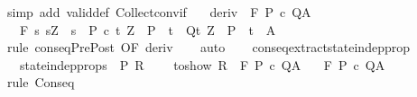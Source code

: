 \begin{isabellebody}
%
\isadelimproof
%
\endisadelimproof
%
\isatagproof
{}\isamarkupfalse%
\ {\isacharparenleft}simp\ add{\isacharcolon}\ valid{\isacharunderscore}def\ Collect{\isacharunderscore}conv{\isacharunderscore}if{\isacharparenright}%
\endisatagproof
{\isafoldproof}%
%
\isadelimproof
\isanewline
%
\endisadelimproof
\isanewline
{}\isamarkupfalse%
\isanewline
\ \ \ deriv{\isacharcolon}\ {\isachardoublequoteopen}{\isasymGamma}{\isacharcomma}{\isacharbraceleft}{\isacharbraceright}\ {\isasymturnstile}\isactrlbsub {\isacharslash}F\isactrlesub \ P\ c\ Q{\isacharcomma}A{\isachardoublequoteclose}\isanewline
\ \ \ {\isachardoublequoteopen}{\isasymGamma}{\isacharcomma}{\isacharbraceleft}{\isacharbraceright}{\isasymturnstile}\isactrlbsub {\isacharslash}F\isactrlesub \ {\isacharbraceleft}s{\isachardot}\ s{\isacharequal}Z\ {\isasymand}\ s\ {\isasymin}\ P{\isacharbraceright}\ c\ {\isacharbraceleft}t{\isachardot}\ Z\ {\isasymin}\ P\ {\isasymlongrightarrow}\ t\ {\isasymin}\ Q{\isacharbraceright}{\isacharcomma}{\isacharbraceleft}t{\isachardot}\ Z\ {\isasymin}\ P\ {\isasymlongrightarrow}\ t\ {\isasymin}\ A{\isacharbraceright}{\isachardoublequoteclose}\isanewline
%
\isadelimproof
\ \ %
\endisadelimproof
%
\isatagproof
{}\isamarkupfalse%
\ {\isacharparenleft}rule\ conseqPrePost\ {\isacharbrackleft}OF\ deriv{\isacharbrackright}{\isacharparenright}\isanewline
\ \ \isamarkupfalse%
\ auto\isanewline
\ \ \isamarkupfalse%
%
\endisatagproof
{\isafoldproof}%
%
\isadelimproof
\isanewline
%
\endisadelimproof
\isanewline
{}\isamarkupfalse%
\ conseq{\isacharunderscore}extract{\isacharunderscore}state{\isacharunderscore}indep{\isacharunderscore}prop{\isacharcolon}\ \isanewline
\ \ \ state{\isacharunderscore}indep{\isacharunderscore}prop{\isacharcolon}{\isachardoublequoteopen}{\isasymforall}s\ {\isasymin}\ P{\isachardot}\ R{\isachardoublequoteclose}\ \isanewline
\ \ \ to{\isacharunderscore}show{\isacharcolon}\ {\isachardoublequoteopen}R\ {\isasymLongrightarrow}\ {\isasymGamma}{\isacharcomma}{\isasymTheta}{\isasymturnstile}\isactrlbsub {\isacharslash}F\isactrlesub \ P\ c\ Q{\isacharcomma}A{\isachardoublequoteclose}\isanewline
\ \ \ {\isachardoublequoteopen}{\isasymGamma}{\isacharcomma}{\isasymTheta}{\isasymturnstile}\isactrlbsub {\isacharslash}F\isactrlesub \ P\ c\ Q{\isacharcomma}A{\isachardoublequoteclose}\isanewline
%
\isadelimproof
\ \ %
\endisadelimproof
%
\isatagproof
{}\isamarkupfalse%
\ {\isacharparenleft}rule\ Conseq{\isacharparenright}\isanewline

\end{isabellebody}
